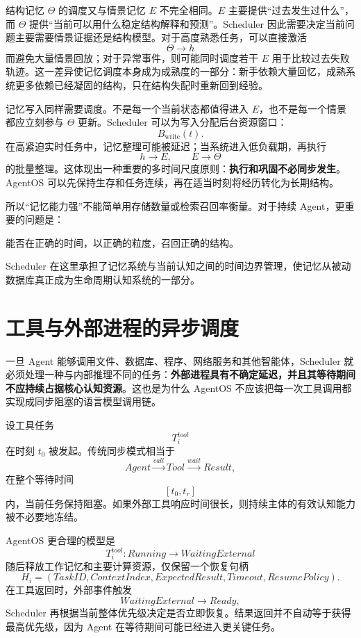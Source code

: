 结构记忆 $\Theta$ 的调度又与情景记忆 $E$ 不完全相同。$E$ 主要提供“过去发生过什么”，而 $\Theta$ 提供“当前可以用什么稳定结构解释和预测”。Scheduler 因此需要决定当前问题主要需要情景证据还是结构模型。对于高度熟悉任务，可以直接激活
\[
\Theta\rightarrow h
\]
而避免大量情景回放；对于异常事件，则可能同时调度若干 $E$ 用于比较过去失败轨迹。这一差异使记忆调度本身成为成熟度的一部分：新手依赖大量回忆，成熟系统更多依赖已经凝固的结构，只在结构失配时重新回到经验。

记忆写入同样需要调度。不是每一个当前状态都值得进入 $E$，也不是每一个情景都应立刻参与 $\Theta$ 更新。Scheduler 可以为写入分配后台资源窗口：
\[
B_{\mathrm{write}}(t).
\]
在高紧迫实时任务中，记忆整理可能被延迟；当系统进入低负载期，再执行
\[
h\rightarrow E,
\qquad
E\rightarrow\Theta
\]
的批量整理。这体现出一种重要的多时间尺度原则：\textbf{执行和巩固不必同步发生}。AgentOS 可以先保持生存和任务连续，再在适当时刻将经历转化为长期结构。

所以“记忆能力强”不能简单用存储数量或检索召回率衡量。对于持续 Agent，更重要的问题是：
\begin{statementbox}
能否在正确的时间，以正确的粒度，召回正确的结构。
\end{statementbox}
Scheduler 在这里承担了记忆系统与当前认知之间的时间边界管理，使记忆从被动数据库真正成为生命周期认知系统的一部分。

\section{工具与外部进程的异步调度}

一旦 Agent 能够调用文件、数据库、程序、网络服务和其他智能体，Scheduler 就必须处理一种与内部推理不同的任务：\textbf{外部进程具有不确定延迟，并且其等待期间不应持续占据核心认知资源}。这也是为什么 AgentOS 不应该把每一次工具调用都实现成同步阻塞的语言模型调用链。

设工具任务
\[
T_i^{tool}
\]
在时刻 $t_0$ 被发起。传统同步模式相当于
\[
Agent
\xrightarrow{call}
Tool
\xrightarrow{wait}
Result,
\]
在整个等待时间
\[
[t_0,t_r]
\]
内，当前任务保持阻塞。如果外部工具响应时间很长，则持续主体的有效认知能力被不必要地冻结。

AgentOS 更合理的模型是
\[
T_i^{tool}:
Running
\rightarrow
WaitingExternal
\]
随后释放工作记忆和主要计算资源，仅保留一个恢复句柄
\[
H_i=
(
TaskID,
ContextIndex,
ExpectedResult,
Timeout,
ResumePolicy
).
\]
在工具返回时，外部事件触发
\[
WaitingExternal
\rightarrow
Ready,
\]
Scheduler 再根据当前整体优先级决定是否立即恢复。结果返回并不自动等于获得最高优先级，因为 Agent 在等待期间可能已经进入更关键任务。


